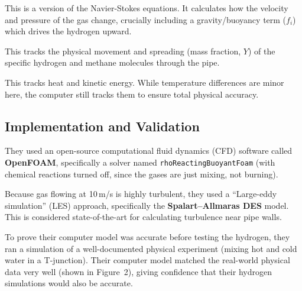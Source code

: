 \documentclass[12pt,a4paper]{report}
\begin{document}
\begin{description}[style=nextline, font=\normalfont\bfseries, leftmargin=1.5em]

  \item[Conservation of Momentum (Eq~9):]
  This is a version of the Navier-Stokes equations. It calculates how the velocity and pressure of the gas change, crucially including a gravity/buoyancy term ($f_i$) which drives the hydrogen upward.

  \item[Species Advection (Eq~10):]
  This tracks the physical movement and spreading (mass fraction, $Y$) of the specific hydrogen and methane molecules through the pipe.

  \item[Energy/Enthalpy (Eq~11):]
  This tracks heat and kinetic energy. While temperature differences are minor here, the computer still tracks them to ensure total physical accuracy.

\end{description}

\subsection{Implementation and Validation}

\begin{description}[style=nextline, font=\normalfont\bfseries, leftmargin=1.5em]

  \item[The Software:]
  They used an open-source computational fluid dynamics (CFD) software called \textbf{OpenFOAM}, specifically a solver named \texttt{rhoReactingBuoyantFoam} (with chemical reactions turned off, since the gases are just mixing, not burning).

  \item[Turbulence Model:]
  Because gas flowing at 10\,m/s is highly turbulent, they used a ``Large-eddy simulation'' (LES) approach, specifically the \textbf{Spalart--Allmaras DES} model. This is considered state-of-the-art for calculating turbulence near pipe walls.

  \item[Validation:]
  To prove their computer model was accurate before testing the hydrogen, they ran a simulation of a well-documented physical experiment (mixing hot and cold water in a T-junction). Their computer model matched the real-world physical data very well (shown in Figure~2), giving confidence that their hydrogen simulations would also be accurate.

\end{description}
\end{document}

